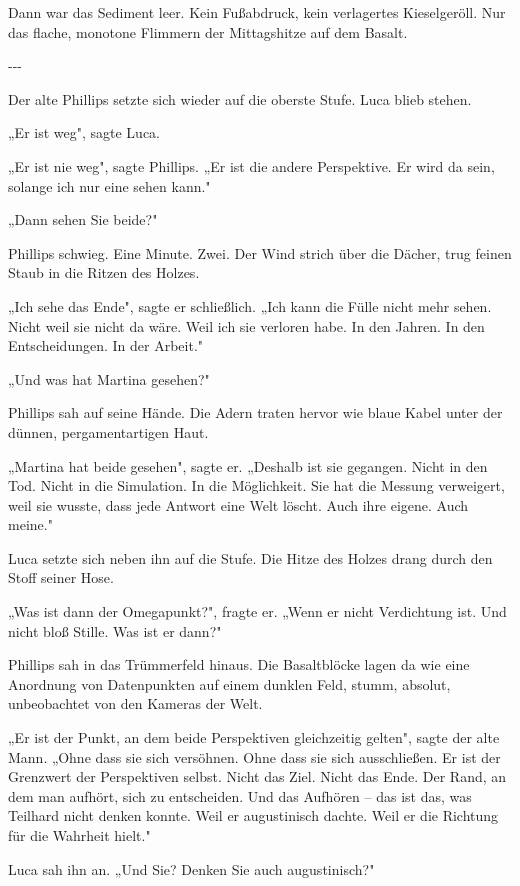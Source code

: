 \documentclass[
  ngerman,
]{article}
\begin{document}
Dann war das Sediment leer. Kein Fußabdruck, kein verlagertes
Kieselgeröll. Nur das flache, monotone Flimmern der Mittagshitze auf dem
Basalt.

-\/-\/-

Der alte Phillips setzte sich wieder auf die oberste Stufe. Luca blieb
stehen.

„Er ist weg", sagte Luca.

„Er ist nie weg", sagte Phillips. „Er ist die andere Perspektive. Er
wird da sein, solange ich nur eine sehen kann."

„Dann sehen Sie beide?"

Phillips schwieg. Eine Minute. Zwei. Der Wind strich über die Dächer,
trug feinen Staub in die Ritzen des Holzes.

„Ich sehe das Ende", sagte er schließlich. „Ich kann die Fülle nicht
mehr sehen. Nicht weil sie nicht da wäre. Weil ich sie verloren habe. In
den Jahren. In den Entscheidungen. In der Arbeit."

„Und was hat Martina gesehen?"

Phillips sah auf seine Hände. Die Adern traten hervor wie blaue Kabel
unter der dünnen, pergamentartigen Haut.

„Martina hat beide gesehen", sagte er. „Deshalb ist sie gegangen. Nicht
in den Tod. Nicht in die Simulation. In die Möglichkeit. Sie hat die
Messung verweigert, weil sie wusste, dass jede Antwort eine Welt löscht.
Auch ihre eigene. Auch meine."

Luca setzte sich neben ihn auf die Stufe. Die Hitze des Holzes drang
durch den Stoff seiner Hose.

„Was ist dann der Omegapunkt?", fragte er. „Wenn er nicht Verdichtung
ist. Und nicht bloß Stille. Was ist er dann?"

Phillips sah in das Trümmerfeld hinaus. Die Basaltblöcke lagen da wie
eine Anordnung von Datenpunkten auf einem dunklen Feld, stumm, absolut,
unbeobachtet von den Kameras der Welt.

„Er ist der Punkt, an dem beide Perspektiven gleichzeitig gelten", sagte
der alte Mann. „Ohne dass sie sich versöhnen. Ohne dass sie sich
ausschließen. Er ist der Grenzwert der Perspektiven selbst. Nicht das
Ziel. Nicht das Ende. Der Rand, an dem man aufhört, sich zu entscheiden.
Und das Aufhören -- das ist das, was Teilhard nicht denken konnte. Weil
er augustinisch dachte. Weil er die Richtung für die Wahrheit hielt."

Luca sah ihn an. „Und Sie? Denken Sie auch augustinisch?"
\end{document}
